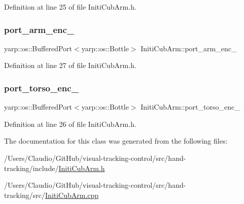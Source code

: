Definition at line 25 of file Initi\+Cub\+Arm.\+h.

\mbox{\label{classInitiCubArm_a0eb264a33270c599c0621b2148096516}} 
\subsubsection{\texorpdfstring{port\+\_\+arm\+\_\+enc\+\_\+}{port\_arm\_enc\_}}
{\footnotesize\ttfamily yarp\+::os\+::\+Buffered\+Port$<$yarp\+::os\+::\+Bottle$>$ Initi\+Cub\+Arm\+::port\+\_\+arm\+\_\+enc\+\_\+\hspace{0.3cm}{\ttfamily [private]}}



Definition at line 27 of file Initi\+Cub\+Arm.\+h.

\mbox{\label{classInitiCubArm_a1587e14242e40ec6cefaecfd1d88aff4}} 
\subsubsection{\texorpdfstring{port\+\_\+torso\+\_\+enc\+\_\+}{port\_torso\_enc\_}}
{\footnotesize\ttfamily yarp\+::os\+::\+Buffered\+Port$<$yarp\+::os\+::\+Bottle$>$ Initi\+Cub\+Arm\+::port\+\_\+torso\+\_\+enc\+\_\+\hspace{0.3cm}{\ttfamily [private]}}



Definition at line 26 of file Initi\+Cub\+Arm.\+h.



The documentation for this class was generated from the following files\+:\begin{DoxyCompactItemize}
\item 
/\+Users/\+Claudio/\+Git\+Hub/visual-\/tracking-\/control/src/hand-\/tracking/include/\hyperlink{InitiCubArm_8h}{Initi\+Cub\+Arm.\+h}\item 
/\+Users/\+Claudio/\+Git\+Hub/visual-\/tracking-\/control/src/hand-\/tracking/src/\hyperlink{InitiCubArm_8cpp}{Initi\+Cub\+Arm.\+cpp}\end{DoxyCompactItemize}

